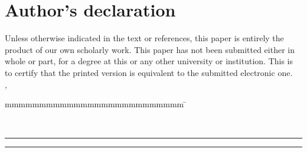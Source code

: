 \thispagestyle{empty}

\section*{Author's declaration}

\vspace*{2em}
Unless otherwise indicated in the text or references, this paper is entirely the product of our own scholarly work. This paper has not been submitted either in whole or part, for a degree at this or any other university or institution. This is to certify that the printed version is equivalent to the submitted electronic one.
\vspace*{3em}\\
\abgabeort, \datumAbgabe\\
\begin{tabbing}
	mmmmmmmmmmmmmmmmmmmmmmmmmm     \= \kill


	\vspace*{4em}\\
	\rule{6cm}{0.4pt} \> \rule{6cm}{0.4pt}\\
	\autorA			\> \autorB



\end{tabbing}